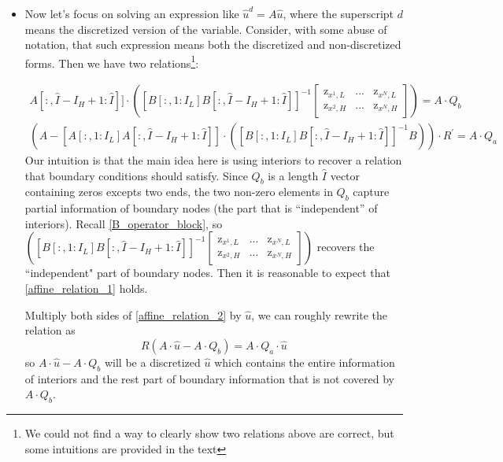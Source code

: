\documentclass[11pt]{article}
\begin{document}
\begin{itemize}
	\item Now let's focus on solving an expression like $\hat{u}^d = A \hat{u}$, where the superscript $d$ means the discretized version of the variable. Consider, with some abuse of notation, that such expression means both the discretized and non-discretized forms. Then we have two relations\footnote{We could not find a way to clearly show two relations above are correct, but some intuitions are provided in the text}:
	
	\begin{align}
		[A[:, 1:I_L] A[:,\hat{I}-I_H+1:\hat{I}]]\cdot\left([B[:,1:I_L] B[:,\hat{I}-I_H+1:\hat{I}]]^{-1}\begin{bmatrix}
			\text{z}_{x^{1},L} & ... & \text{z}_{x^{N},L}\\
			\text{z}_{x^{2},H} & ... & \text{z}_{x^{N},H}
		\end{bmatrix}\right) = A\cdot Q_b\label{affine_relation_1}
	\end{align}
	\begin{align}
		(A-[A[:,1:I_L] A[:,\hat{I}-I_H+1:\hat{I}]]\cdot([B[:,1:I_L] B[:,\hat{I}-I_H+1:\hat{I}]]^{-1} B))\cdot R^{'} = A\cdot Q_a\label{affine_relation_2}
	\end{align}		
	Our intuition is that the main idea here is using interiors to recover a relation that boundary conditions should satisfy. Since $Q_b$ is a length $\hat{I}$ vector containing zeros excepts two ends, the two non-zero elements in $Q_b$ capture partial information of boundary nodes (the part that is ``independent'' of interiors).  Recall \eqref{B_operator_block}, so $\left([B[:,1:I_L] B[:,\hat{I}-I_H+1:\hat{I}]]^{-1}\begin{bmatrix}
	\text{z}_{x^{1},L} & ... & \text{z}_{x^{N},L}\\
	\text{z}_{x^{2},H} & ... & \text{z}_{x^{N},H}
	\end{bmatrix}\right)$ recovers the ``independent" part of boundary nodes. Then it is reasonable to expect that \eqref{affine_relation_1} holds.
	
	Multiply both sides of \eqref{affine_relation_2} by $\hat{u}$, we can roughly rewrite the relation as
	\begin{equation}
		R(A\cdot \hat{u}-A\cdot Q_b) = A\cdot Q_a\cdot \hat{u}
	\end{equation}
	so $A\cdot \hat{u}-A\cdot Q_b$ will be a discretized $\hat{u}$ which contains the entire information of interiors and the rest part of boundary information that is not covered by $A\cdot Q_b$. 
	

\end{itemize}
\end{document}
